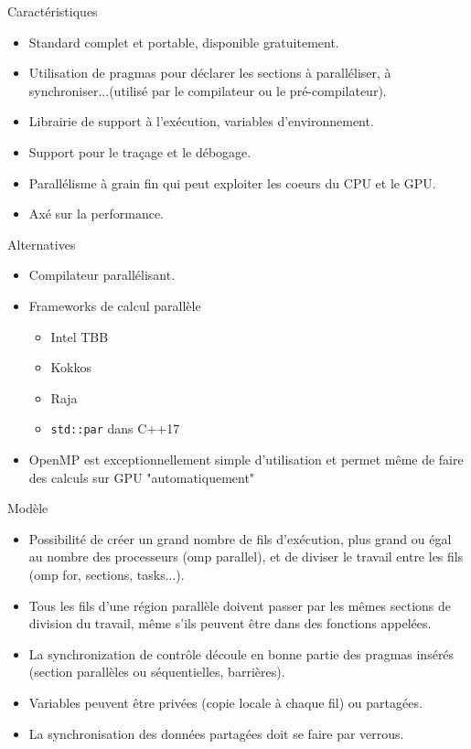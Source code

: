 \documentclass[10pt]{beamer}
\begin{document}
\begin{frame}{Caractéristiques}

  \begin{itemize}
    \item Standard complet et portable, disponible gratuitement.
    \item Utilisation de pragmas pour déclarer les sections à paralléliser, à synchroniser...(utilisé par le compilateur ou le pré-compilateur).
    \item Librairie de support à l'exécution, variables d'environnement.
    \item Support pour le traçage et le débogage. 
    \item Parallélisme à grain fin qui peut exploiter les coeurs du CPU et le GPU.
    \item Axé sur la performance.
  \end{itemize}
\end{frame}

\begin{frame}{Alternatives}

  \begin{itemize}
    \item Compilateur parallélisant.
    \item Frameworks de calcul parallèle
    \begin{itemize}
      \item Intel TBB
      \item Kokkos
      \item Raja
      \item \texttt{std::par} dans C++17
    \end{itemize}
    \item OpenMP est exceptionnellement simple d'utilisation et permet même de faire des calculs sur
    GPU "automatiquement"
  \end{itemize}
\end{frame}

\begin{frame}{Modèle}

  \begin{itemize}
    \item Possibilité de créer un grand nombre de fils d'exécution, plus grand ou égal au nombre des processeurs (omp parallel), et de diviser le travail entre les fils (omp for, sections, tasks...).
    \item Tous les fils d'une région parallèle doivent passer par les mêmes sections de division du travail, même s'ils peuvent être dans des fonctions appelées.
    \item La synchronization de contrôle découle en bonne partie des pragmas insérés (section parallèles ou séquentielles, barrières).
    \item Variables peuvent être privées (copie locale à chaque fil) ou partagées.
    \item La synchronisation des données partagées doit se faire par verrous.
  \end{itemize}
\end{frame}
\end{document}

